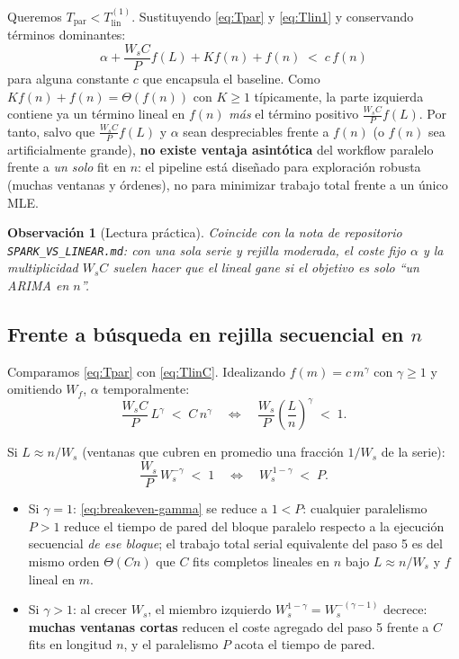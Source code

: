 \documentclass[11pt,a4paper]{article}
\newtheorem{remark}{Observación}
\begin{document}
Queremos $T_{\mathrm{par}} < T_{\mathrm{lin}}^{(1)}$. Sustituyendo
\eqref{eq:Tpar} y \eqref{eq:Tlin1} y conservando términos dominantes:
\begin{equation}
  \alpha + \frac{W_s C}{P} f(L) + K f(n) + f(n) \;<\; c\, f(n)
\end{equation}
para alguna constante $c$ que encapsula el baseline. Como $K f(n) + f(n) =
\Theta(f(n))$ con $K\ge 1$ típicamente, la parte izquierda contiene ya un término
lineal en $f(n)$ \emph{más} el término positivo $\frac{W_s C}{P} f(L)$. Por tanto,
salvo que $\frac{W_s C}{P} f(L)$ y $\alpha$ sean despreciables frente a $f(n)$ (o
$f(n)$ sea artificialmente grande), \textbf{no existe ventaja asintótica} del
workflow paralelo frente a \emph{un solo} fit en $n$: el pipeline está diseñado
para exploración robusta (muchas ventanas y órdenes), no para minimizar trabajo
total frente a un único MLE.

\begin{remark}[Lectura práctica]
  Coincide con la nota de repositorio \texttt{SPARK\_VS\_LINEAR.md}: con una sola
  serie y rejilla moderada, el coste fijo $\alpha$ y la multiplicidad $W_s C$
  suelen hacer que el lineal gane si el objetivo es solo ``un ARIMA en $n$''.
\end{remark}

\subsection{Frente a búsqueda en rejilla secuencial en $n$}

Comparamos \eqref{eq:Tpar} con \eqref{eq:TlinC}. Idealizando $f(m) = c\, m^\gamma$
con $\gamma\ge 1$ y omitiendo $W_f$, $\alpha$ temporalmente:
\begin{equation}
  \frac{W_s C}{P}\, L^\gamma \;<\; C\, n^\gamma
  \quad\Longleftrightarrow\quad
  \frac{W_s}{P}\left(\frac{L}{n}\right)^\gamma \;<\; 1 .
\end{equation}

Si $L \approx n / W_s$ (ventanas que cubren en promedio una fracción $1/W_s$ de
la serie):
\begin{equation}
  \label{eq:breakeven-gamma}
  \frac{W_s}{P}\, W_s^{-\gamma} \;<\; 1
  \quad\Longleftrightarrow\quad
  W_s^{\,1-\gamma} \;<\; P .
\end{equation}

\begin{itemize}
  \item Si $\gamma=1$: \eqref{eq:breakeven-gamma} se reduce a $1 < P$: cualquier
  paralelismo $P>1$ reduce el tiempo de pared del bloque paralelo respecto a la
  ejecución secuencial \emph{de ese bloque}; el trabajo total serial equivalente
  del paso 5 es del mismo orden $\Theta(C n)$ que $C$ fits completos lineales en
  $n$ bajo $L\approx n/W_s$ y $f$ lineal en $m$.
  \item Si $\gamma>1$: al crecer $W_s$, el miembro izquierdo
  $W_s^{1-\gamma}=W_s^{-(\gamma-1)}$ decrece: \textbf{muchas ventanas cortas}
  reducen el coste agregado del paso 5 frente a $C$ fits en longitud $n$, y el
  paralelismo $P$ acota el tiempo de pared.
\end{itemize}
\end{document}
